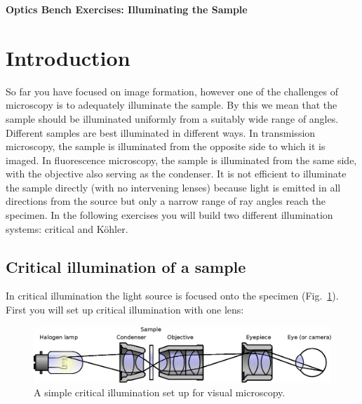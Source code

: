 \documentclass[a4paper]{report}
\begin{document}
\setcounter{secnumdepth}{2}

\begin{center}
\textbf{\Large{Optics Bench Exercises: Illuminating the Sample}}
\end{center}

\section{Introduction}
So far you have focused on image formation, however one of the challenges of microscopy is to adequately illuminate the sample. 
By this we mean that the sample should be illuminated uniformly from a suitably wide range of angles. 
Different samples are best illuminated in different ways.
In transmission microscopy, the sample is illuminated from the opposite side to which it is imaged. 
In fluorescence microscopy, the sample is illuminated from the same side, with the objective also serving as the condenser. 
It is not efficient to illuminate the sample directly (with no intervening lenses) because light is emitted in all directions from the source but only a narrow range of ray angles reach the specimen. 
In the following exercises you will build two different illumination systems: critical and K\"{o}hler. 


\subsection{Critical illumination of a sample}
In critical illumination the light source is focused onto the specimen (Fig.~\ref{critIlum}).
First you will set up critical illumination with one lens:

\begin{figure}[h]
\center
\includegraphics[width=5in]{Critical_Illumination.eps}
\caption{A simple critical illumination set up for visual microscopy.}
\label{critIlum}
\end{figure}
\end{document}
